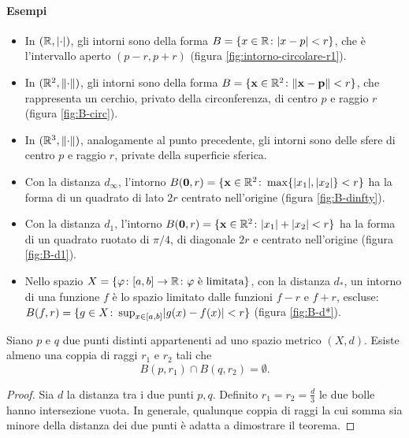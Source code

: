 \paragraph{Esempi}
\begin{itemize}
	\item In $(\mathbb{R},\lvert\cdot\rvert)$, gli intorni sono della forma $B=\{x\in\mathbb{R}\colon\lvert x-p\rvert<r\}$, che è l'intervallo aperto $(p-r,p+r)$ (figura \ref{fig:intorno-circolare-r1}).
		
	\item In $(\mathbb{R}^2,\lVert\cdot\rVert)$, gli intorni sono della forma $B=\{\mathbf{x}\in\mathbb{R}^2\colon\lVert\mathbf{x}-\mathbf{p}\rVert<r\}$, che rappresenta un cerchio, privato della circonferenza, di centro $p$ e raggio $r$ (figura \ref{fig:B-circ}).
		
	\item In $(\mathbb{R}^3,\lVert\cdot\rVert)$, analogamente al punto precedente, gli intorni sono delle sfere di centro $p$ e raggio $r$, private della superficie sferica.
	\item Con la distanza $d_\infty$, l'intorno $B(\mathbf{0},r)=\{\mathbf{x}\in\mathbb{R}^2\colon\max\{\lvert x_1\rvert,\lvert x_2\rvert\}<r\}$ ha la forma di un quadrato di lato $2r$ centrato nell'origine (figura \ref{fig:B-dinfty}).
	
	\item Con la distanza $d_1$, l'intorno $B(\mathbf{0},r)=\{\mathbf{x}\in\mathbb{R}^2\colon\lvert x_1\rvert+\lvert x_2\rvert<r\}$ ha la forma di un quadrato ruotato di $\pi/4$, di diagonale $2r$ e centrato nell'origine (figura \ref{fig:B-d1}).
	
	\item Nello spazio $X=\{\varphi\colon[a,b]\to\mathbb{R}\colon\varphi\text{ è limitata}\}$, con la distanza $d_*$, un intorno di una funzione $f$ è lo spazio limitato dalle funzioni $f-r$ e $f+r$, escluse: $B(f,r)=\{g\in X\colon\sup_{x\in[a,b]}\lvert g(x)-f(x)\rvert<r\}$ (figura \ref{fig:B-d*}).
	
\end{itemize}

\begin{teorema}
\label{t:hausdorff}
Siano $p$ e $q$ due punti distinti appartenenti ad uno spazio metrico $(X,d)$. Esiste almeno una coppia di raggi $r_1$ e $r_2$ tali che
\[
B(p,r_1)\cap B(q,r_2)=\emptyset.
\]
\end{teorema}
\begin{proof}
	Sia $d$ la distanza tra i due punti $p,q$. Definito $r_1=r_2=\frac{d}3$ le due bolle hanno intersezione vuota. In generale, qualunque coppia di raggi la cui somma sia minore della distanza dei due punti è adatta a dimostrare il teorema.
\end{proof}

